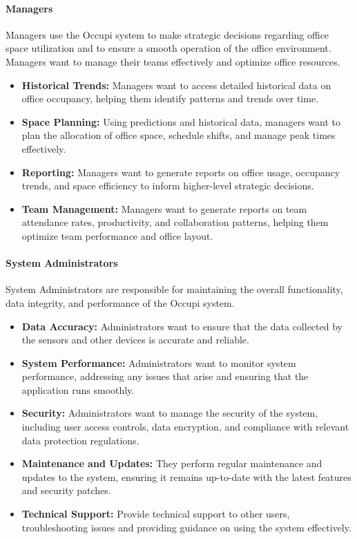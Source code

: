 \documentclass[11pt,a4paper]{article}
\begin{document}
\paragraph{Managers}
Managers use the Occupi system to make strategic decisions regarding office space utilization and to ensure a smooth operation of the office environment. Managers want to manage their teams effectively and optimize office resources.

\begin{itemize}
    \item \textbf{Historical Trends:} Managers want to access detailed historical data on office occupancy, helping them identify patterns and trends over time.
    \item \textbf{Space Planning:} Using predictions and historical data, managers want to plan the allocation of office space, schedule shifts, and manage peak times effectively.
    \item \textbf{Reporting:} Managers want to generate reports on office usage, occupancy trends, and space efficiency to inform higher-level strategic decisions.
    \item \textbf{Team Management:} Managers want to generate reports on team attendance rates, productivity, and collaboration patterns, helping them optimize team performance and office layout.
\end{itemize}

\paragraph{System Administrators}
System Administrators are responsible for maintaining the overall functionality, data integrity, and performance of the Occupi system.

\begin{itemize}
    \item \textbf{Data Accuracy:} Administrators want to ensure that the data collected by the sensors and other devices is accurate and reliable.
    \item \textbf{System Performance:} Administrators want to monitor system performance, addressing any issues that arise and ensuring that the application runs smoothly.
    \item \textbf{Security:} Administrators want to manage the security of the system, including user access controls, data encryption, and compliance with relevant data protection regulations.
    \item \textbf{Maintenance and Updates:} They perform regular maintenance and updates to the system, ensuring it remains up-to-date with the latest features and security patches.
    \item \textbf{Technical Support:} Provide technical support to other users, troubleshooting issues and providing guidance on using the system effectively.
\end{itemize}
\end{document}
